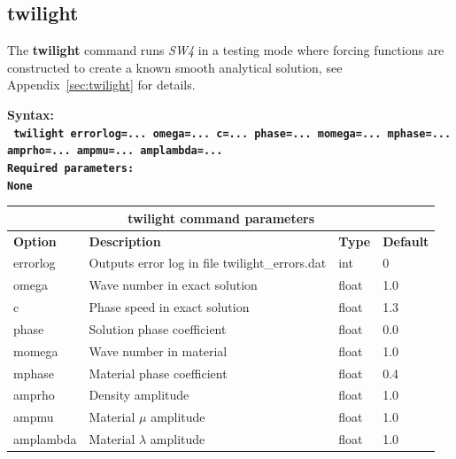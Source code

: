 \documentclass[11pt]{report}
\begin{document}
\subsection{twilight}
\label{keyword:twilight}
The {\bf twilight} command runs \emph{SW4} in a testing mode where forcing functions are constructed to
create a known smooth analytical solution, see Appendix~\ref{sec:twilight} for details. 
\begin{flushleft}
\bf
Syntax:\\
\tt
twilight errorlog=... omega=... c=... phase=... momega=... mphase=... amprho=... ampmu=... amplambda=...
\\
\bf Required parameters:\\
\rm
None
\end{flushleft}
\begin{center}
\begin{tabular}{|l|p{8cm}|l|l|} \hline
\multicolumn{4}{|c|}{\bf twilight command parameters}\\ \hline
\bf{Option} & \bf{Description} & \bf{Type} & \bf{Default} \\ \hline \hline
errorlog & Outputs error log in file twilight\_errors.dat & int & 0 \\ \hline
omega & Wave number in exact solution                           & float & 1.0 \\ \hline
c & Phase speed in exact solution                         & float & 1.3 \\ \hline
phase & Solution phase coefficient                        & float & 0.0 \\ \hline
momega & Wave number in material                          & float & 1.0 \\ \hline
mphase & Material phase coefficient                       & float & 0.4 \\ \hline
amprho & Density amplitude                                & float & 1.0 \\ \hline
ampmu & Material $\mu$ amplitude                          & float & 1.0 \\ \hline
amplambda & Material $\lambda$ amplitude                  & float & 1.0 \\ \hline
\end{tabular}
\end{center}

\end{document}
